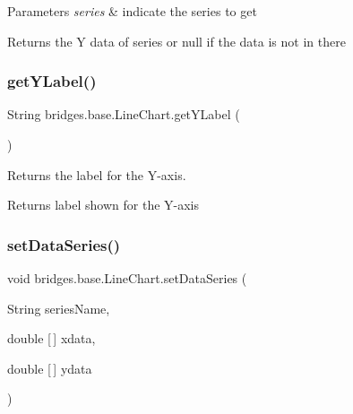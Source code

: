 \begin{DoxyParams}{Parameters}
{\em series} & indicate the series to get \\
\hline
\end{DoxyParams}
\begin{DoxyReturn}{Returns}
the Y data of series or null if the data is not in there 
\end{DoxyReturn}
\mbox{\label{classbridges_1_1base_1_1_line_chart_ad3ae17da720b1f89406ab742379ddfd6}} 
\subsubsection{\texorpdfstring{get\+Y\+Label()}{getYLabel()}}
{\footnotesize\ttfamily String bridges.\+base.\+Line\+Chart.\+get\+Y\+Label (\begin{DoxyParamCaption}{ }\end{DoxyParamCaption})}



Returns the label for the Y-\/axis. 

\begin{DoxyReturn}{Returns}
label shown for the Y-\/axis 
\end{DoxyReturn}
\mbox{\label{classbridges_1_1base_1_1_line_chart_a586e9953b13e51ab9e592acfb034887b}} 
\subsubsection{\texorpdfstring{set\+Data\+Series()}{setDataSeries()}\hspace{0.1cm}{\footnotesize\ttfamily [1/4]}}
{\footnotesize\ttfamily void bridges.\+base.\+Line\+Chart.\+set\+Data\+Series (\begin{DoxyParamCaption}\item[{String}]{series\+Name,  }\item[{double \mbox{[}$\,$\mbox{]}}]{xdata,  }\item[{double \mbox{[}$\,$\mbox{]}}]{ydata }\end{DoxyParamCaption})}



